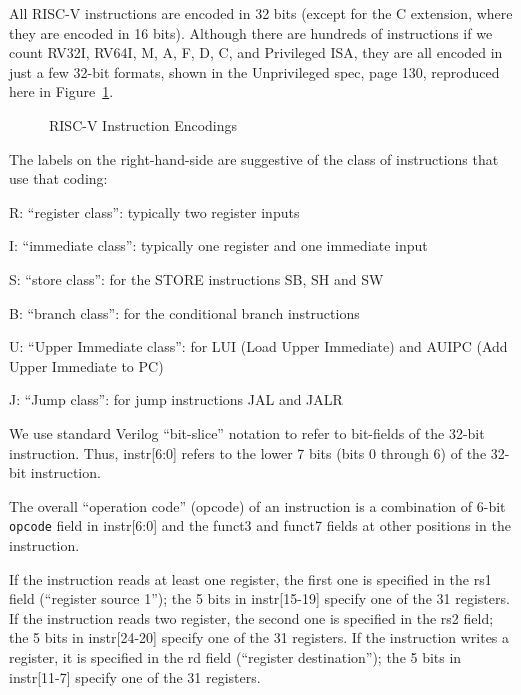 All RISC-V instructions are encoded in 32 bits (except for the C
extension, where they are encoded in 16 bits).  Although there are
hundreds of instructions if we count RV32I, RV64I, M, A, F, D, C, and
Privileged ISA, they are all encoded in just a few 32-bit formats,
shown in the Unprivileged spec, page 130, reproduced here in
Figure~\ref{Fig_Instr_Encodings}.
\begin{figure}[htbp]
  \centerline{}
  \caption{\label{Fig_Instr_Encodings} RISC-V Instruction Encodings}
\end{figure}
The labels on the right-hand-side are suggestive of the class of
instructions that use that coding:
\begin{tightlist}
  \item R: ``register class'': typically two register inputs
  \item I: ``immediate class'': typically one register and one immediate input
  \item S: ``store class'': for the STORE instructions SB, SH and SW
  \item B: ``branch class'': for the conditional branch instructions
  \item U: ``Upper Immediate class'': for LUI (Load Upper Immediate)
        and AUIPC (Add Upper Immediate to PC)
  \item J: ``Jump class'': for jump instructions JAL and JALR
\end{tightlist}

We use standard Verilog ``bit-slice'' notation to refer to bit-fields
of the 32-bit instruction. Thus, instr[6:0] refers to the lower 7 bits
(bits 0 through 6) of the 32-bit instruction.

The overall ``operation code'' (opcode) of an instruction is a
combination of 6-bit \verb|opcode| field in instr[6:0] and the funct3
and funct7 fields at other positions in the instruction.

If the instruction reads at least one register, the first one is
specified in the rs1 field (``register source 1''); the 5 bits in
instr[15-19] specify one of the 31 registers.  If the instruction
reads two register, the second one is specified in the rs2 field; the
5 bits in instr[24-20] specify one of the 31 registers.  If the
instruction writes a register, it is specified in the rd field
(``register destination''); the 5 bits in instr[11-7] specify one of
the 31 registers.


